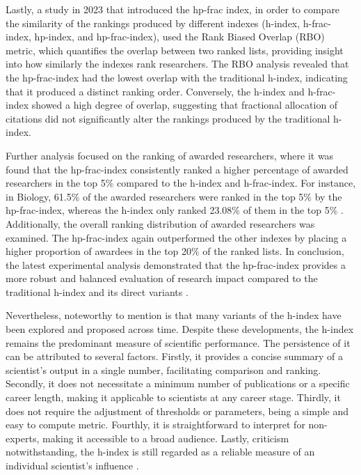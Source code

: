 Lastly, a study in 2023 that introduced the hp-frac index, in order to compare
the similarity of the rankings produced by different indexes (h-index,
h-frac-index, hp-index, and hp-frac-index), used the Rank Biased Overlap (RBO)
metric, which quantifies the overlap between two ranked lists, providing
insight into how similarly the indexes rank researchers. The RBO analysis
revealed that the hp-frac-index had the lowest overlap with the traditional
h-index, indicating that it produced a distinct ranking order. Conversely, the
h-index and h-frac-index showed a high degree of overlap, suggesting that
fractional allocation of citations did not significantly alter the rankings
produced by the traditional h-index.

Further analysis focused on the ranking of awarded researchers, where it was
found that the hp-frac-index consistently ranked a higher percentage of awarded
researchers in the top 5\% compared to the h-index and h-frac-index. For
instance, in Biology, 61.5\% of the awarded researchers were ranked in the top
5\% by the hp-frac-index, whereas the h-index only ranked 23.08\% of them in
the top 5\% \cite{singhal2023hp}. Additionally, the overall ranking
distribution of awarded researchers was examined. The hp-frac-index again
outperformed the other indexes by placing a higher proportion of awardees in
the top 20\% of the ranked lists. In conclusion, the latest experimental
analysis demonstrated that the hp-frac-index provides a more robust and
balanced evaluation of research impact compared to the traditional h-index and
its direct variants \cite{singhal2023hp}.

Nevertheless, noteworthy to mention is that many variants of the h-index have
been explored and proposed across time. Despite these developments, the h-index
remains the predominant measure of scientific performance. The persistence of it
can be attributed to several factors. Firstly, it provides a concise summary of
a scientist’s output in a single number, facilitating comparison and ranking.
Secondly, it does not necessitate a minimum number of publications or a
specific career length, making it applicable to scientists at any career stage.
Thirdly, it does not require the adjustment of thresholds or parameters, being
a simple and easy to compute metric. Fourthly, it is straightforward to
interpret for non-experts, making it accessible to a broad audience. Lastly,
criticism notwithstanding, the h-index is still regarded as a reliable measure
of an individual scientist’s influence \cite{koltun2021h}.
